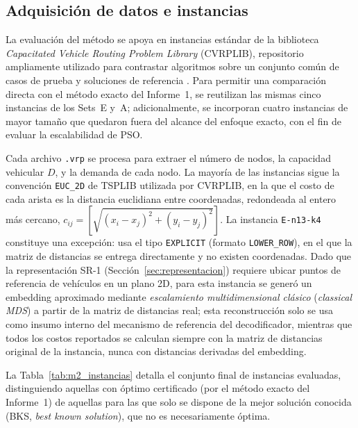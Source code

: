 \subsection{Adquisición de datos e instancias}

La evaluación del método se apoya en instancias estándar de la biblioteca
\textit{Capacitated Vehicle Routing Problem Library} (CVRPLIB), repositorio ampliamente
utilizado para contrastar algoritmos sobre un conjunto común de casos de prueba y
soluciones de referencia \parencite{cvrplib}. Para permitir una comparación directa con
el método exacto del Informe~1, se reutilizan las mismas cinco instancias de los
Sets~E y~A; adicionalmente, se incorporan cuatro instancias de mayor tamaño que quedaron
fuera del alcance del enfoque exacto, con el fin de evaluar la escalabilidad de PSO.

Cada archivo \texttt{.vrp} se procesa para extraer el número de nodos, la capacidad
vehicular $D$, y la demanda de cada nodo. La mayoría de las instancias sigue la
convención \texttt{EUC\_2D} de TSPLIB utilizada por CVRPLIB, en la que el costo de cada
arista es la distancia euclidiana entre coordenadas, redondeada al entero más cercano,
$c_{ij} = \left[ \sqrt{(x_i-x_j)^2 + (y_i-y_j)^2} \right]$. La instancia \texttt{E-n13-k4}
constituye una excepción: usa el tipo \texttt{EXPLICIT} (formato \texttt{LOWER\_ROW}), en
el que la matriz de distancias se entrega directamente y no existen coordenadas. Dado que
la representación SR-1 (Sección~\ref{sec:representacion}) requiere ubicar puntos de
referencia de vehículos en un plano 2D, para esta instancia se generó un embedding
aproximado mediante \textit{escalamiento multidimensional clásico} (\textit{classical
MDS}) a partir de la matriz de distancias real; esta reconstrucción solo se usa como
insumo interno del mecanismo de referencia del decodificador, mientras que todos los
costos reportados se calculan siempre con la matriz de distancias original de la
instancia, nunca con distancias derivadas del embedding.

La Tabla~\ref{tab:m2_instancias} detalla el conjunto final de instancias evaluadas,
distinguiendo aquellas con óptimo certificado (por el método exacto del Informe~1) de
aquellas para las que solo se dispone de la mejor solución conocida (BKS, \textit{best
known solution}), que no es necesariamente óptima.

